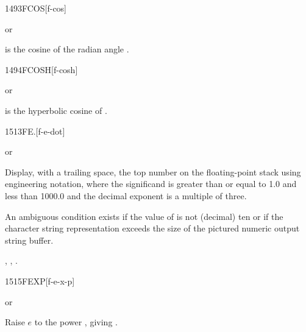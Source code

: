 \begin{worddef}{1493}{FCOS}[f-cos]
\item {} or

	 is the cosine of the radian angle .
\end{worddef}


\begin{worddef}{1494}{FCOSH}[f-cosh]
\item {} or

	 is the hyperbolic cosine of .
\end{worddef}


\begin{worddef}{1513}{FE.}[f-e-dot]
\item \stack{}{}  or

	Display, with a trailing space, the top number on the
	floating-point stack using engineering notation, where the
	significand is greater than or equal to 1.0 and less than
	1000.0 and the decimal exponent is a multiple of three.

	An ambiguous condition exists if the value of 
	is not (decimal) ten or if the character string representation
	exceeds the size of the pictured numeric output string buffer.

\see {},
	,
	.
\end{worddef}


\begin{worddef}{1515}{FEXP}[f-e-x-p]
\item {} or

	Raise $e$ to the power , giving .
\end{worddef}


